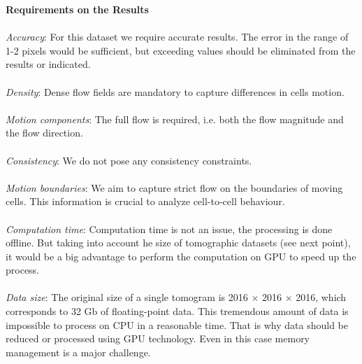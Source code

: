 \textbf{Requirements on the Results}
\\
\\
\textit{Accuracy}: For this dataset we require accurate results. The error in the range of 1-2 pixels would be sufficient, but exceeding values should be eliminated from the results or indicated.
\\
\\
\textit{Density}: Dense flow fields are mandatory to capture differences in cells motion. 
\\
\\
\textit{Motion components}: The full flow is required, i.e. both the flow magnitude and the flow direction. 
\\
\\
\textit{Consistency}: We do not pose any consistency constraints.
\\
\\
\textit{Motion boundaries}: We aim to capture strict flow on the boundaries of moving cells. This information is crucial to analyze cell-to-cell behaviour.  
\\
\\
\textit{Computation time}: Computation time is not an issue, the processing is done offline. But taking into account he size of tomographic datasets (see next point), it would be a big advantage to perform the computation on GPU to speed up the process.
\\
\\
\textit{Data size}: The original size of a single tomogram is 2016 $\times$ 2016 $\times$ 2016, which corresponds to 32 Gb of floating-point data. This tremendous amount of data is impossible to process on CPU in a reasonable time. That is why data should be reduced or processed using GPU technology. Even in this case memory management is a major challenge.   



